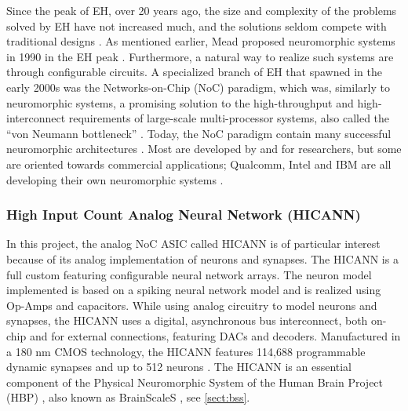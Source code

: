 Since the peak of EH, over 20 years ago, the size and complexity of the problems solved by EH have not increased much, and the solutions seldom compete with traditional designs \cite{haddow_challenges_2011}.
As mentioned earlier, Mead proposed neuromorphic systems in 1990 in the EH peak \cite{mead_neuromorphic_1990}.
Furthermore, a natural way to realize such systems are through configurable circuits.
A specialized branch of EH that spawned in the early 2000s was the Networks-on-Chip (NoC) paradigm,
which was, similarly to neuromorphic systems, a promising solution to the high-throughput and high-interconnect requirements of large-scale multi-processor systems, also called the  ``von Neumann bottleneck'' \cite{benini_networks_2002}\cite{trefzer_evolvable_2015}\cite{mead_neuromorphic_1990}.
Today, the NoC paradigm contain many successful neuromorphic architectures \cite{trefzer_evolvable_2015}.
Most are developed by and for researchers, but some are oriented towards commercial applications;
Qualcomm, Intel and IBM are all developing their own neuromorphic systems \cite{meier_mixed-signal_2015}\cite{davies_loihi_2018}\cite{debole_truenorth_2019}\cite{trefzer_evolvable_2015}.

\subsubsection{High Input Count Analog Neural Network (HICANN)} \label{sect:hicann}
In this project, the analog NoC ASIC called HICANN is of particular interest\cite{schemmel_wafer-scale_2008} because of its analog implementation of neurons and synapses.
 The HICANN is a full custom featuring configurable neural network arrays.
The neuron model implemented is based on a spiking neural network model and is realized using Op-Amps and capacitors.
While using analog circuitry to model neurons and synapses, the HICANN uses a digital, asynchronous bus interconnect, both on-chip and for external connections, featuring DACs and decoders.
Manufactured in a 180 nm CMOS technology, the HICANN features 114,688 programmable dynamic synapses and up to 512 neurons \cite{zoschke_full_2017}.
\cite{haddow_challenges_2011}\cite{trefzer_evolvable_2015}
The HICANN is an essential component of the Physical Neuromorphic System of the Human Brain Project (HBP) \cite{markram_introducing_2011}, also known as BrainScaleS \cite{meier_mixed-signal_2015}, see \vref{sect:bss}.


















